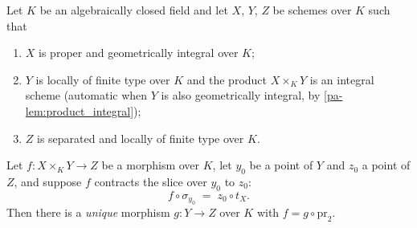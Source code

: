 \begin{theorem}[Rigidity]
  \label{pa-thm:rigidity}
  \leanok

  Let \(K\) be an algebraically closed field and let \(X\), \(Y\), \(Z\) be schemes over
  \(K\) such that
  \begin{enumerate}
    \item \(X\) is proper and geometrically integral over \(K\);
    \item \(Y\) is locally of finite type over \(K\) and the product \(X \times_K Y\) is an
      integral scheme (automatic when \(Y\) is also geometrically integral, by
      \ref{pa-lem:product_integral});
    \item \(Z\) is separated and locally of finite type over \(K\).
  \end{enumerate}
  Let \(f : X \times_K Y \to Z\) be a morphism over \(K\), let \(y_0\) be a point of \(Y\)
  and \(z_0\) a point of \(Z\), and suppose \(f\) contracts the slice over \(y_0\) to
  \(z_0\):
  \[
    f \circ \sigma_{y_0} \;=\; z_0 \circ t_X .
  \]
  Then there is a \emph{unique} morphism \(g : Y \to Z\) over \(K\) with
  \(f = g \circ \mathrm{pr}_2\).
\end{theorem}
